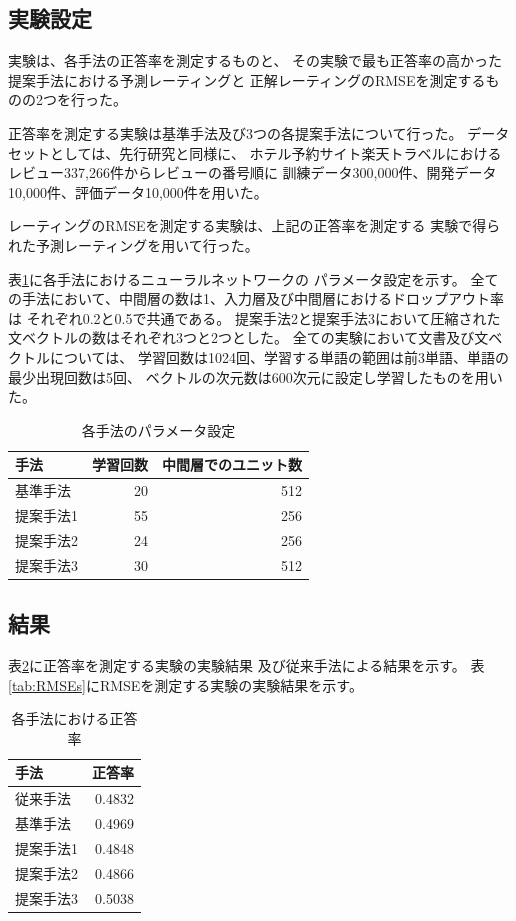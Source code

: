 \documentclass[twocolumn,a4paper]{ltjarticle}
\begin{document}
\subsection{実験設定}

実験は、各手法の正答率を測定するものと、
その実験で最も正答率の高かった提案手法における予測レーティングと
正解レーティングのRMSEを測定するものの2つを行った。

正答率を測定する実験は基準手法及び3つの各提案手法について行った。
データセットとしては、先行研究\cite{fujitani15}と同様に、
ホテル予約サイト楽天トラベルにおけるレビュー337,266件からレビューの番号順に
訓練データ300,000件、開発データ10,000件、評価データ10,000件を用いた。

レーティングのRMSEを測定する実験は、上記の正答率を測定する
実験で得られた予測レーティングを用いて行った。

表\ref{tab:ParametersOfMethods}に各手法におけるニューラルネットワークの
パラメータ設定を示す。
全ての手法において、中間層の数は1、入力層及び中間層におけるドロップアウト率は
それぞれ0.2と0.5で共通である。
提案手法2と提案手法3において圧縮された文ベクトルの数はそれぞれ3つと2つとした。
全ての実験において文書及び文ベクトルについては、
学習回数は1024回、学習する単語の範囲は前3単語、単語の最少出現回数は5回、
ベクトルの次元数は600次元に設定し学習したものを用いた。

\begin{table}
  \caption{各手法のパラメータ設定}
  \centering
  \begin{tabular}{l | r r} \label{tab:ParametersOfMethods}
    手法 & 学習回数 & 中間層でのユニット数 \\
    \hline
    基準手法  & 20 & 512 \\
    提案手法1 & 55 & 256 \\
    提案手法2 & 24 & 256 \\
    提案手法3 & 30 & 512 \\
  \end{tabular}
\end{table}


\subsection{結果}

表\ref{tab:Accuracies}に正答率を測定する実験の実験結果
及び従来手法\cite{fujitani15}による結果を示す。
表\ref{tab:RMSEs}にRMSEを測定する実験の実験結果を示す。

\begin{table}
  \caption{各手法における正答率}
  \centering
  \begin{tabular}{l | r} \label{tab:Accuracies}
    手法 & 正答率 \\
    \hline
    従来手法\cite{fujitani15}  & 0.4832 \\
    基準手法  & 0.4969 \\
    提案手法1 & 0.4848 \\
    提案手法2 & 0.4866 \\
    提案手法3 & 0.5038 \\
  \end{tabular}
\end{table}
\end{document}
